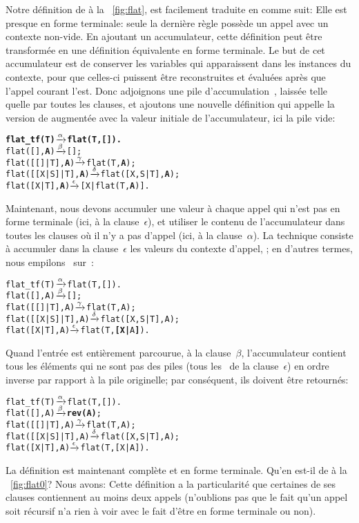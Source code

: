 Notre définition de  à la \fig~\vref{fig:flat}, est
facilement traduite en \Erlang comme suit: 
Elle est presque en forme terminale: seule la dernière règle possède
un appel avec un contexte non-vide. En ajoutant un accumulateur, cette
définition peut être transformée en une définition équivalente en
forme terminale. Le but de cet accumulateur est de conserver les
variables qui apparaissent dans les instances du contexte, pour que
celles-ci puissent être reconstruites et évaluées après que l'appel
courant l'est. Donc adjoignons une pile d'accumulation~,
laissée telle quelle par toutes les clauses, et ajoutons une nouvelle
définition  qui appelle la version de
 augmentée avec la valeur initiale de l'accumulateur,
ici la pile vide:
\begin{alltt}
\textbf{flat_tf(T)        \(\xrightarrow{\smash{\alpha}}\) flat(T,[]).}
flat(       [],\textbf{A}) \(\xrightarrow{\smash{\beta}}\) [];\hfill% A \emph{inutile pour le moment}
flat(   [[]|T],\textbf{A}) \(\xrightarrow{\smash{\gamma}}\) flat(T,\textbf{A});
flat([[X|S]|T],\textbf{A}) \(\xrightarrow{\smash{\delta}}\) flat([X,S|T],\textbf{A});
flat(    [X|T],\textbf{A}) \(\xrightarrow{\smash{\epsilon}}\) [X|flat(T,\textbf{A})].
\end{alltt}
Maintenant, nous devons accumuler une valeur à chaque appel qui n'est
pas en forme terminale (ici, à la clause~\(\epsilon\)), et utiliser le
contenu de l'accumulateur dans toutes les clauses où il n'y a pas
d'appel (ici, à la clause~\(\alpha\)). La technique consiste à
accumuler dans la clause~\(\epsilon\) les valeurs du contexte d'appel,
\erlcode{[X|\textvisiblespace]}; en d'autres termes, nous
empilons~ sur~:
\begin{alltt}
flat_tf(T)        \(\smashedrightarrow{\alpha}\) flat(T,[]).
flat(       [],A) \(\smashedrightarrow{\beta}\) [];
flat(   [[]|T],A) \(\smashedrightarrow{\gamma}\) flat(T,A);
flat([[X|S]|T],A) \(\smashedrightarrow{\delta}\) flat([X,S|T],A);
flat(    [X|T],A) \(\smashedrightarrow{\epsilon}\) flat(T,\textbf{[X|}A\textbf{]}).\hfill% \emph{Ici}
\end{alltt}
Quand l'entrée est entièrement parcourue, à la clause~\(\beta\),
l'accumulateur contient tous les éléments qui ne sont pas des piles
(tous les~ de la clause~\(\epsilon\)) en ordre inverse par
rapport à la pile originelle; par conséquent, ils doivent être
retournés:
\begin{alltt}
flat_tf(T)        \(\smashedrightarrow{\alpha}\) flat(T,[]).
flat(       [],A) \(\smashedrightarrow{\beta}\) \textbf{rev(A)};
flat(   [[]|T],A) \(\smashedrightarrow{\gamma}\) flat(T,A);
flat([[X|S]|T],A) \(\smashedrightarrow{\delta}\) flat([X,S|T],A);
flat(    [X|T],A) \(\smashedrightarrow{\epsilon}\) flat(T,[X|A]).
\end{alltt}
La définition est maintenant complète et en forme terminale. Qu'en
est-il de  à la \fig~\vref{fig:flat0}? Nous avons:
 Cette définition a la particularité que
certaines de ses clauses contiennent au moins deux appels (n'oublions
pas que le fait qu'un appel soit récursif n'a rien à voir avec le fait
d'être en forme terminale ou non).

